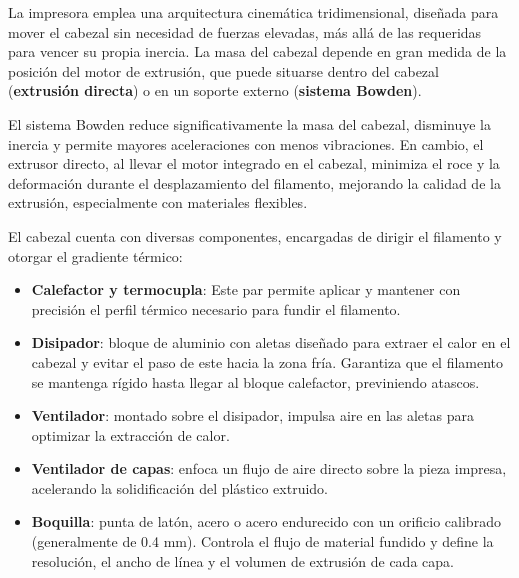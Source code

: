 La impresora emplea una arquitectura cinemática tridimensional, diseñada para mover el cabezal sin necesidad de fuerzas elevadas, más allá de las requeridas para vencer su propia inercia. La masa del cabezal depende en gran medida de la posición del motor de extrusión, que puede situarse dentro del cabezal (\textbf{extrusión directa}) o en un soporte externo (\textbf{sistema Bowden}).

El sistema Bowden reduce significativamente la masa del cabezal, disminuye la inercia y permite mayores aceleraciones con menos vibraciones. En cambio, el extrusor directo, al llevar el motor integrado en el cabezal, minimiza el roce y la deformación durante el desplazamiento del filamento, mejorando la calidad de la extrusión, especialmente con materiales flexibles.

El cabezal cuenta con diversas componentes, encargadas de dirigir el filamento y otorgar el gradiente térmico:

\begin{itemize}
  \item \textbf{Calefactor y termocupla}: Este par permite aplicar y mantener con precisión el perfil térmico necesario para fundir el filamento.

  \item \textbf{Disipador}: bloque de aluminio con aletas diseñado para extraer el calor en el cabezal y evitar el paso de este hacia la zona fría. Garantiza que el filamento se mantenga rígido hasta llegar al bloque calefactor, previniendo atascos.

  \item \textbf{Ventilador}: montado sobre el disipador, impulsa aire en las aletas para optimizar la extracción de calor. 

  \item \textbf{Ventilador de capas}: enfoca un flujo de aire directo sobre la pieza impresa, acelerando la solidificación del plástico extruido. 

  \item \textbf{Boquilla}: punta de latón, acero o acero endurecido con un orificio calibrado (generalmente de 0.4 mm). Controla el flujo de material fundido y define la resolución, el ancho de línea y el volumen de extrusión de cada capa.
\end{itemize}

